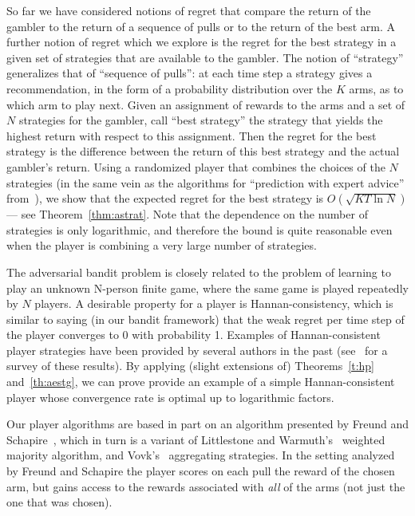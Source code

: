\documentclass[12pt]{article}
\begin{document}
So far we have considered notions of regret that compare the return of
the gambler to the return of a sequence of pulls or to the return of the
best arm. A further notion of regret which we explore is the regret for
the best strategy in a given set of strategies that are available to the
gambler. The notion of ``strategy'' generalizes that of ``sequence of pulls'':
at each time step a strategy gives a recommendation, in the form of a probability
distribution over the $K$ arms, as to which arm to play next.
Given an assignment of rewards to the arms and a set of $N$ strategies
for the gambler, call ``best strategy'' the strategy that yields the highest return
with respect to this assignment. Then the regret for the best strategy is the
difference between the return of this best strategy and the actual gambler's
return. Using a randomized player that combines the choices of the $N$ strategies
(in the same vein as the algorithms for ``prediction with expert advice''
from~\cite{CesabianchiFrHeHaScWa97}), we show that the expected regret for
the best strategy is $O(\sqrt{KT\ln N})$ --- see Theorem~\ref{thm:astrat}.
Note that the dependence on the number of strategies is only logarithmic,
and therefore the bound is quite reasonable even when the player is
combining a very large number of strategies.

The adversarial bandit problem is closely related to the problem of
learning to play an unknown N-person finite game, where the same game
is played repeatedly by $N$ players. A desirable property for a player
is Hannan-consistency, which is similar to saying (in our bandit framework)
that the weak regret per time step of the player converges to 0 with probability 1.
Examples of Hannan-consistent player strategies have
been provided by several authors in the past (see~\cite{FV97} for a survey of these
results). By applying (slight extensions of) Theorems~\ref{t:hp} and~\ref{th:aestg},
we can prove provide an example of a simple Hannan-consistent player whose
convergence rate is optimal up to logarithmic factors.

Our player algorithms are based in part on an algorithm presented by 
Freund and Schapire~\cite{FreundSc97,FreundSc9?}, 
which in turn is a variant of Littlestone and
Warmuth's~\cite{LittlestoneWa94} weighted majority algorithm, and
Vovk's~\cite{Vovk90} aggregating strategies.
In the setting analyzed by Freund and Schapire
the player scores on each pull the reward of the chosen arm, but
gains access to the rewards associated with {\em all} of the arms
(not just the one that was chosen).
\end{document}
